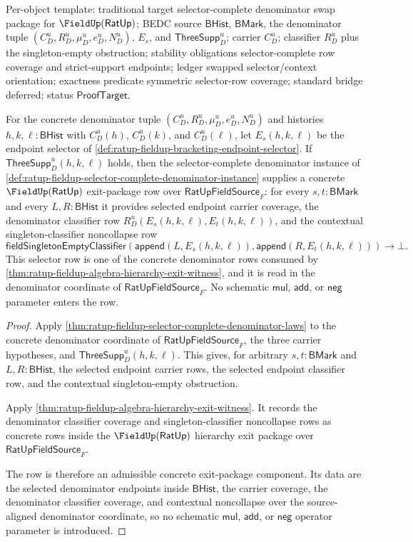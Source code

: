 Per-object template: traditional target selector-complete denominator swap
package for $\FieldUp(\mathsf{RatUp})$; BEDC source $\mathsf{BHist}$,
$\mathsf{BMark}$, the denominator tuple $(C_D^u,R_D^u,\mu_D^u,e_D^u,N_D^u)$,
$E_s$, and $\mathsf{ThreeSupp}_D^u$; carrier $C_D^u$; classifier $R_D^u$ plus
the singleton-empty obstruction; stability obligations selector-complete row
coverage and strict-support endpoints; ledger swapped selector/context
orientation; exactness predicate symmetric selector-row coverage; standard
bridge deferred; status $\mathsf{ProofTarget}$.

\begin{theorem}
\label{thm:ratup-fieldup-selector-complete-exit-package}
For the concrete denominator tuple $(C_D^u,R_D^u,\mu_D^u,e_D^u,N_D^u)$ and
histories $h,k,\ell:\mathsf{BHist}$ with $C_D^u(h)$, $C_D^u(k)$, and
$C_D^u(\ell)$, let $E_s(h,k,\ell)$ be the endpoint selector of
\autoref{def:ratup-fieldup-bracketing-endpoint-selector}. If
$\mathsf{ThreeSupp}_D^u(h,k,\ell)$ holds, then the selector-complete
denominator instance of
\autoref{def:ratup-fieldup-selector-complete-denominator-instance} supplies a
concrete $\FieldUp(\mathsf{RatUp})$ exit-package row over
$\mathsf{RatUpFieldSource}_F$: for every $s,t:\mathsf{BMark}$ and every
$L,R:\mathsf{BHist}$ it provides selected endpoint carrier coverage, the
denominator classifier row
$R_D^u(E_s(h,k,\ell),E_t(h,k,\ell))$, and the contextual singleton-classifier
noncollapse row
$$
\mathsf{fieldSingletonEmptyClassifier}
(\mathsf{append}(L,E_s(h,k,\ell)),\mathsf{append}(R,E_t(h,k,\ell)))\to\bot.
$$
This selector row is one of the concrete denominator rows consumed by
\autoref{thm:ratup-fieldup-algebra-hierarchy-exit-witness}, and it is read in
the denominator coordinate of $\mathsf{RatUpFieldSource}_F$. No schematic
$\mathsf{mul}$, $\mathsf{add}$, or $\mathsf{neg}$ parameter enters the row.
\end{theorem}
\begin{proof}
Apply \autoref{thm:ratup-fieldup-selector-complete-denominator-laws} to the
concrete denominator coordinate of $\mathsf{RatUpFieldSource}_F$, the three
carrier hypotheses, and
$\mathsf{ThreeSupp}_D^u(h,k,\ell)$. This gives, for arbitrary
$s,t:\mathsf{BMark}$ and $L,R:\mathsf{BHist}$, the selected endpoint carrier
rows, the selected endpoint classifier row, and the contextual singleton-empty
obstruction.

Apply \autoref{thm:ratup-fieldup-algebra-hierarchy-exit-witness}. It records
the denominator classifier coverage and singleton-classifier noncollapse rows
as concrete rows inside the $\FieldUp(\mathsf{RatUp})$ hierarchy exit package
over $\mathsf{RatUpFieldSource}_F$.

The row is therefore an admissible concrete exit-package component. Its data
are the selected denominator endpoints inside $\mathsf{BHist}$, the carrier
coverage, the denominator classifier coverage, and contextual noncollapse over
the source-aligned denominator coordinate, so no schematic $\mathsf{mul}$,
$\mathsf{add}$, or $\mathsf{neg}$ operator parameter is introduced.
\end{proof}

